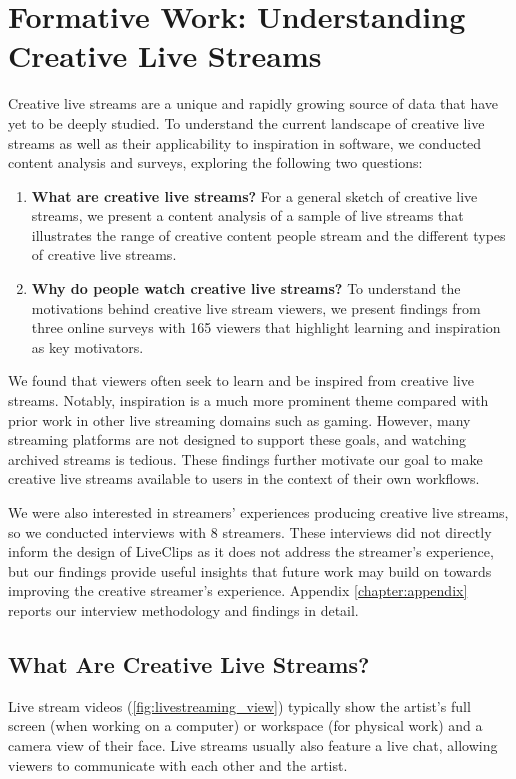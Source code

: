 \section{Formative Work: Understanding Creative Live Streams}
\label{sec:liveclips_formative}
Creative live streams are a unique and rapidly growing source of data that have yet to be deeply studied.  To understand the current landscape of creative live streams as well as their applicability to inspiration in software, we conducted content analysis and surveys, exploring the following two questions:

\begin{enumerate}
    \item \textbf{What are creative live streams?} For a general sketch of creative live streams, we present a content analysis of a sample of live streams that illustrates the range of creative content people stream and the different types of creative live streams.
    \item \textbf{Why do people watch creative live streams?} To understand the motivations behind creative live stream viewers, we present findings from three online surveys with 165 viewers that highlight learning and inspiration as key motivators.
\end{enumerate}

We found that viewers often seek to learn and be inspired from creative live streams. Notably, inspiration is a much more prominent theme compared with prior work in other live streaming domains such as gaming. However, many streaming platforms are not designed to support these goals, and watching archived streams is tedious. These findings further motivate our goal to make creative live streams available to users in the context of their own workflows.

We were also interested in streamers' experiences producing creative live streams, so we conducted interviews with 8 streamers. These interviews did not directly inform the design of LiveClips as it does not address the streamer's experience, but our findings provide useful insights that future work may build on towards improving the creative streamer's experience. Appendix \ref{chapter:appendix} reports our interview methodology and findings in detail.

\subsection{What Are Creative Live Streams?}
Live stream videos (\autoref{fig:livestreaming_view}) typically show the artist's full screen (when working on a computer) or workspace (for physical work) and a camera view of their face. Live streams usually also feature a live chat, allowing viewers to communicate with each other and the artist. 

